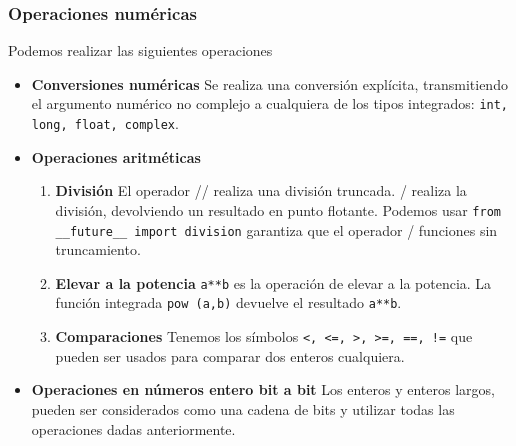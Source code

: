 \documentclass[10pt]{beamer}
\begin{document}
\begin{frame}[fragile]
\frametitle{Operaciones num\'ericas}
Podemos realizar las siguientes operaciones

\vspace{0.2cm}

\begin{itemize}
\item \textbf{Conversiones num\'ericas} Se realiza una conversi\'on expl\'icita, transmitiendo el argumento num\'erico no complejo a cualquiera de los tipos integrados: \texttt{int, long, float, complex}.
\item \textbf{Operaciones aritm\'eticas} 
\begin{enumerate}
\item \textbf{Divisi\'on} El operador // realiza una divisi\'on truncada. / realiza la divisi\'on, devolviendo un resultado en punto flotante. Podemos usar \texttt{from \_\_future\_\_ import division} garantiza que el operador / funciones sin truncamiento.
\item \textbf{Elevar a la potencia} \texttt{a**b} es la operaci\'on de elevar a la potencia. La funci\'on integrada \texttt{pow (a,b)} devuelve el resultado \texttt{a**b}.
\item \textbf{Comparaciones} Tenemos los s\'imbolos \texttt{<, <=, >, >=, ==, !=}  que pueden ser usados para comparar dos enteros cualquiera.
\end{enumerate}
\item \textbf{Operaciones en n\'umeros entero bit a bit} Los enteros y enteros largos, pueden ser considerados como una cadena de bits y utilizar todas las operaciones dadas anteriormente. 
\end{itemize}
\end{frame}
\end{document}
